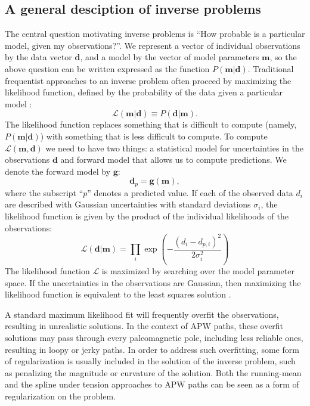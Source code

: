 \documentclass[preprint,12pt,authoryear]{elsarticle}
\begin{document}
\subsection{A general desciption of inverse problems}
\label{sec:intro_inverse_problems}
The central question motivating inverse problems is ``How probable is a particular model, given my observations?''.
We represent a vector of individual observations by the data vector $\mathbf{d}$, and a model
by the vector of model parameters $\mathbf{m}$, so the above question can be written expressed as the function $P(\mathbf{m} \vert \mathbf{d})$.
Traditional frequentist approaches to an inverse problem often proceed by maximizing the likelihood function,
defined by the probability of the data given a particular model \citep[e.g][]{aster2005parameter}:
\begin{equation}
\mathcal{L} ( \mathbf{m} \vert \mathbf{d} ) \equiv P( \mathbf{d} \vert \mathbf{m} ).
\label{eq:likelihood}
\end{equation}
The likelihood function replaces something that is difficult to compute (namely, $P(\mathbf{m} \vert \mathbf{d})$)
with something that is less difficult to compute. 
To compute $\mathcal{L}(\mathbf{m}, \mathbf{d})$ we need to have two things: a statistical model for 
uncertainties in the observations $\mathbf{d}$ and forward model that allows us to compute
predictions. We denote the forward model by $\mathbf{g}$:
\begin{equation}
\mathbf{d}_p = \mathbf{g}(\mathbf{m}),
\label{eq:forward}
\end{equation}
where the subscript ``$p$'' denotes a predicted value.
If each of the observed data $d_i$ are described with Gaussian uncertainties
with standard deviations $\sigma_i$, the likelihood function is given by the product
of the individual likelihoods of the observations:
\begin{equation}
\mathcal{L}(\mathbf{d} | \mathbf{m} ) = \displaystyle\prod_i \exp\left({-\frac{(d_i - d_{p,i})^2}{2 \sigma_i^2}}\right)
\label{eq:example_likelihood}
\end{equation}
The likelihood function $\mathcal{L}$ is maximized by searching over the model parameter space.
If the uncertainties in the observations are Gaussian, then maximizing the likelihood function is
equivalent to the least squares solution \citep{aster2005parameter}.

A standard maximum likelihood fit will frequently overfit the observations, resulting
in unrealistic solutions. In the context of APW paths, these overfit solutions may
pass through every paleomagnetic pole, including less reliable ones, resulting in
loopy or jerky paths. In order to address such overfitting, some form of regularization is usually
included in the solution of the inverse problem, such as penalizing the magnitude or
curvature of the solution. Both the running-mean and the spline under tension approaches
to APW paths can be seen as a form of regularization on the problem.
\end{document}
